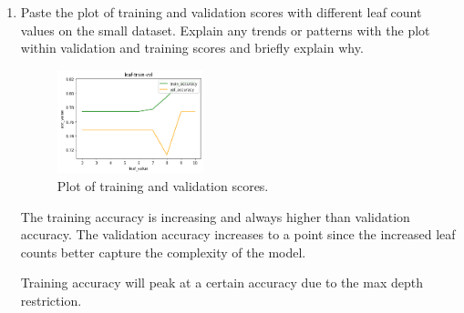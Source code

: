 \begin{enumerate}
    \item Paste the plot of training and validation scores with different leaf count values on the small dataset. Explain any trends or patterns with the plot within validation and training scores and briefly explain why.
    
       \begin{figure}[H]
   	\centering
   	\includegraphics[width=0.4\textwidth]{images/decision_tree_programming.png}
   	\caption{Plot of training and validation scores.}
   	\label{fig:decision_tree_programming}
   \end{figure}
   
  The training accuracy is increasing and always higher than validation accuracy. The validation accuracy increases to a point since the increased leaf counts better capture the complexity of the model.
  
  Training accuracy will peak at a certain accuracy due to the max depth restriction.
    
\end{enumerate}
